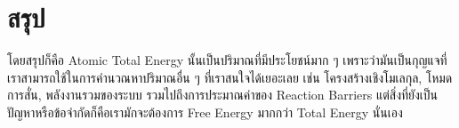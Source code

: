 \section{สรุป}

โดยสรุปก็คือ Atomic Total Energy นั้นเป็นปริมาณที่มีประโยชน์มาก ๆ เพราะว่ามันเป็นกุญแจที่เราสามารถใช้ในการคำนวณหาปริมาณอื่น ๆ ที่เราสนใจได้เยอะเลย เช่น โครงสร้างเชิงโมเลกุล, โหมดการสั่น, พลังงานรวมของระบบ รวมไปถึงการประมาณค่าของ Reaction Barriers แต่สิ่งที่ยังเป็นปัญหาหรือข้อจำกัดก็คือเรามักจะต้องการ Free Energy มากกว่า Total Energy นั่นเอง 
